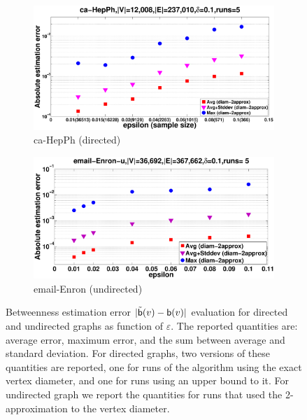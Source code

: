 \begin{figure}[htbp]
  \begin{subfigure}[b]{1\textwidth}
	\centering
    \includegraphics[width=\textwidth,height=0.18\textheight]{figures/eps/ca-HepPh-error}
    \caption{ca-HepPh (directed)}
    \label{fig:HepPh:error}
  \end{subfigure}

  \begin{subfigure}[b]{1\textwidth}
  \centering
    \includegraphics[width=\textwidth,height=0.18\textheight]{figures/eps/email-Enron-error}
    \caption{email-Enron (undirected)}
    \label{fig:email:error}
  \end{subfigure}
  \caption{Betweenness estimation error $|\tilde{\mathsf{b}}(v)-\mathsf{b}(v)|$ evaluation
  for directed and undirected graphs as function of $\varepsilon$. The reported
  quantities are: average error, maximum error, and the sum between average and
  standard deviation. For directed graphs, two versions of these quantities are
  reported, one for runs of the algorithm using the exact vertex diameter, and
  one for runs using an upper bound to it. For undirected graph we report the
  quantities for runs that used the 2-approximation to the vertex diameter.}\label{fig:error}
\end{figure}

